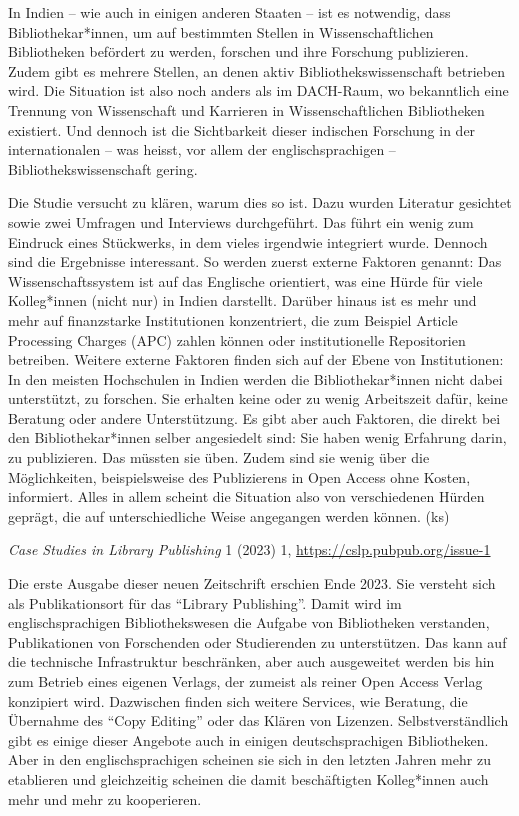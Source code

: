 \documentclass[a4paper,
fontsize=11pt,
oneside,
numbers=noperiodatend,
parskip=half-,
bibliography=totoc,
final
]{scrartcl}
\begin{document}
In Indien -- wie auch in einigen anderen Staaten -- ist es notwendig,
dass Bibliothekar*innen, um auf bestimmten Stellen in Wissenschaftlichen
Bibliotheken befördert zu werden, forschen und ihre Forschung
publizieren. Zudem gibt es mehrere Stellen, an denen aktiv
Bibliothekswissenschaft betrieben wird. Die Situation ist also noch
anders als im DACH-Raum, wo bekanntlich eine Trennung von Wissenschaft
und Karrieren in Wissenschaftlichen Bibliotheken existiert. Und dennoch
ist die Sichtbarkeit dieser indischen Forschung in der internationalen
-- was heisst, vor allem der englischsprachigen --
Bibliothekswissenschaft gering.

Die Studie versucht zu klären, warum dies so ist. Dazu wurden Literatur
gesichtet sowie zwei Umfragen und Interviews durchgeführt. Das führt ein
wenig zum Eindruck eines Stückwerks, in dem vieles irgendwie integriert
wurde. Dennoch sind die Ergebnisse interessant. So werden zuerst externe
Faktoren genannt: Das Wissenschaftssystem ist auf das Englische
orientiert, was eine Hürde für viele Kolleg*innen (nicht nur) in Indien
darstellt. Darüber hinaus ist es mehr und mehr auf finanzstarke
Institutionen konzentriert, die zum Beispiel Article Processing Charges
(APC) zahlen können oder institutionelle Repositorien betreiben. Weitere
externe Faktoren finden sich auf der Ebene von Institutionen: In den
meisten Hochschulen in Indien werden die Bibliothekar*innen nicht dabei
unterstützt, zu forschen. Sie erhalten keine oder zu wenig Arbeitszeit
dafür, keine Beratung oder andere Unterstützung. Es gibt aber auch
Faktoren, die direkt bei den Bibliothekar*innen selber angesiedelt sind:
Sie haben wenig Erfahrung darin, zu publizieren. Das müssten sie üben.
Zudem sind sie wenig über die Möglichkeiten, beispielsweise des
Publizierens in Open Access ohne Kosten, informiert. Alles in allem
scheint die Situation also von verschiedenen Hürden geprägt, die auf
unterschiedliche Weise angegangen werden können. (ks)

\emph{Case Studies in Library Publishing} 1 (2023) 1,
\url{https://cslp.pubpub.org/issue-1}

Die erste Ausgabe dieser neuen Zeitschrift erschien Ende 2023. Sie
versteht sich als Publikationsort für das \enquote{Library Publishing}.
Damit wird im englischsprachigen Bibliothekswesen die Aufgabe von
Bibliotheken verstanden, Publikationen von Forschenden oder Studierenden
zu unterstützen. Das kann auf die technische Infrastruktur beschränken,
aber auch ausgeweitet werden bis hin zum Betrieb eines eigenen Verlags,
der zumeist als reiner Open Access Verlag konzipiert wird. Dazwischen
finden sich weitere Services, wie Beratung, die Übernahme des
\enquote{Copy Editing} oder das Klären von Lizenzen. Selbstverständlich
gibt es einige dieser Angebote auch in einigen deutschsprachigen
Bibliotheken. Aber in den englischsprachigen scheinen sie sich in den
letzten Jahren mehr zu etablieren und gleichzeitig scheinen die damit
beschäftigten Kolleg*innen auch mehr und mehr zu kooperieren.
\end{document}
